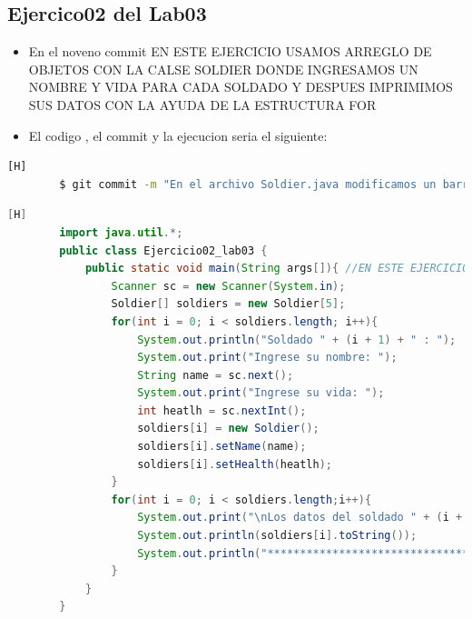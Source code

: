 \documentclass{article}
\begin{document}
	\subsection{Ejercico02 del Lab03}
	\begin{itemize}	
		\item En el noveno commit EN ESTE EJERCICIO USAMOS ARREGLO DE OBJETOS CON LA CALSE SOLDIER DONDE INGRESAMOS UN NOMBRE Y VIDA PARA CADA SOLDADO Y DESPUES IMPRIMIMOS SUS DATOS CON LA AYUDA DE LA ESTRUCTURA FOR 
		\item El codigo , el commit y la ejecucion seria el siguiente:
	\end{itemize}
	\begin{lstlisting}[language=bash,caption={Commit}][H]
		$ git commit -m "En el archivo Soldier.java modificamos un barra espaciadora y en el otro archivo creamos el arreglo de objetos donde pedimos un nombre y una vida para cada soldado , le anadimos y imprimimos sus datos de cada soldado esto usando la estructura for"
	\end{lstlisting}
	\begin{lstlisting}[language=java,caption={Las lineas de codigo de lo creado:}][H]
		import java.util.*;
		public class Ejercicio02_lab03 {
			public static void main(String args[]){ //EN ESTE EJERCICIO USAMOS ARREGLO DE OBJETOS CON LA CALSE SOLDIER DONDE INGRESAMOS UN NOMBRE Y VIDA PARA CADA SOLDADO Y DESPUES IMPRIMIMOS SUS DATOS CON LA AYUDA DE LA ESTRUCTURA FOR 
				Scanner sc = new Scanner(System.in);
				Soldier[] soldiers = new Soldier[5];
				for(int i = 0; i < soldiers.length; i++){
					System.out.println("Soldado " + (i + 1) + " : ");
					System.out.print("Ingrese su nombre: ");
					String name = sc.next();
					System.out.print("Ingrese su vida: ");
					int heatlh = sc.nextInt();
					soldiers[i] = new Soldier();
					soldiers[i].setName(name);
					soldiers[i].setHealth(heatlh);
				}
				for(int i = 0; i < soldiers.length;i++){
					System.out.print("\nLos datos del soldado " + (i + 1) + " : ");
					System.out.println(soldiers[i].toString());
					System.out.println("*************************************");
				}
			}        
		}
	\end{lstlisting}
\end{document}
